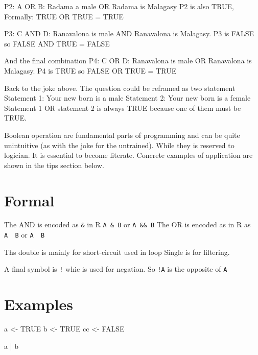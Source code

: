 \documentclass[
  letterpaper,
  DIV=11,
  numbers=noendperiod]{scrreprt}
\newenvironment{Shaded}{\begin{snugshade}}{\end{snugshade}}
\newcommand{\ConstantTok}[1]{\textcolor[rgb]{0.56,0.35,0.01}{#1}}
\newcommand{\NormalTok}[1]{\textcolor[rgb]{0.00,0.23,0.31}{#1}}
\newcommand{\OtherTok}[1]{\textcolor[rgb]{0.00,0.23,0.31}{#1}}
\newcommand{\SpecialCharTok}[1]{\textcolor[rgb]{0.37,0.37,0.37}{#1}}
\begin{document}
P2: A OR B: Radama a male OR Radama is Malagasy P2 is also TRUE,
Formally: TRUE OR TRUE = TRUE

P3: C AND D: Ranavalona is male AND Ranavalona is Malagasy. P3 is FALSE
so FALSE AND TRUE = FALSE

And the final combination P4: C OR D: Ranavalona is male OR Ranavalona
is Malagasy. P4 is TRUE so FALSE OR TRUE = TRUE

Back to the joke above. The question could be reframed as two statement
Statement 1: Your new born is a male Statement 2: Your new born is a
female Statement 1 OR statement 2 is always TRUE because one of them
must be TRUE.

Boolean operation are fundamental parts of programming and can be quite
unintuitive (as with the joke for the untrained). While they is reserved
to logician. It is essential to become literate. Concrete examples of
application are shown in the tips section below.

\section*{Formal}\label{formal-33}


The AND is encoded as \texttt{\&} in R \texttt{A\ \&\ B} or
\texttt{A\ \&\&\ B} The OR is encoded as \texttt{\textbar{}} in R as
\texttt{A\ \textbar{}\ B} or \texttt{A\ \textbar{}\textbar{}\ B}

Ths double is mainly for short-circuit used in loop Single is for
filtering.

A final symbol is \texttt{!} whic is used for negation. So \texttt{!A}
is the opposite of \texttt{A}

\section*{Examples}\label{examples-32}


\begin{Shaded}
\begin{Highlighting}[]
\NormalTok{a }\OtherTok{\textless{}{-}} \ConstantTok{TRUE}
\NormalTok{b }\OtherTok{\textless{}{-}} \ConstantTok{TRUE}
\NormalTok{cc }\OtherTok{\textless{}{-}} \ConstantTok{FALSE}

\NormalTok{a }\SpecialCharTok{|}\NormalTok{ b}
\end{Highlighting}
\end{Shaded}
\end{document}
